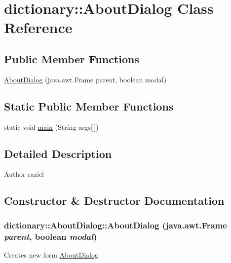 \hypertarget{classdictionary_1_1_about_dialog}{
\section{dictionary::AboutDialog Class Reference}
\label{classdictionary_1_1_about_dialog}
}
\subsection*{Public Member Functions}
\begin{DoxyCompactItemize}
\item 
\hyperlink{classdictionary_1_1_about_dialog_a99478a825a52fb518450daad455cf086}{AboutDialog} (java.awt.Frame parent, boolean modal)
\end{DoxyCompactItemize}
\subsection*{Static Public Member Functions}
\begin{DoxyCompactItemize}
\item 
static void \hyperlink{classdictionary_1_1_about_dialog_aebd31f4196db2d485279739c43eca53e}{main} (String args\mbox{[}$\,$\mbox{]})
\end{DoxyCompactItemize}


\subsection{Detailed Description}
\begin{DoxyAuthor}{Author}
raziel 
\end{DoxyAuthor}


\subsection{Constructor \& Destructor Documentation}
\hypertarget{classdictionary_1_1_about_dialog_a99478a825a52fb518450daad455cf086}{
\subsubsection[{AboutDialog}]{\setlength{\rightskip}{0pt plus 5cm}dictionary::AboutDialog::AboutDialog (java.awt.Frame {\em parent}, \/  boolean {\em modal})}}
\label{classdictionary_1_1_about_dialog_a99478a825a52fb518450daad455cf086}
Creates new form \hyperlink{classdictionary_1_1_about_dialog}{AboutDialog} 

